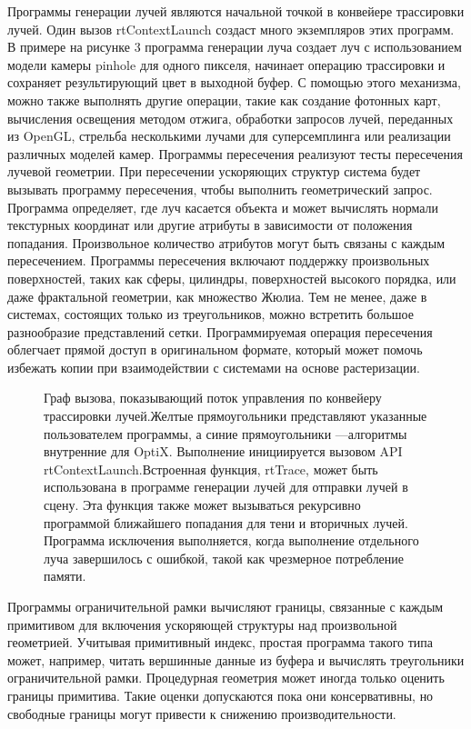 Программы генерации лучей являются начальной точкой в конвейере трассировки лучей.
Один вызов rtContextLaunch создаст много экземпляров этих программ.
В примере на рисунке 3 программа генерации луча создает луч с использованием модели камеры pinhole для одного пикселя, начинает операцию трассировки и сохраняет результирующий цвет в выходной буфер.
 С помощью этого механизма, можно также выполнять другие операции, такие как создание фотонных карт, вычисления освещения методом отжига, обработки запросов лучей, переданных из OpenGL, стрельба несколькими лучами для суперсемплинга или реализации различных моделей камер.
Программы пересечения реализуют тесты пересечения лучевой геометрии.
При пересечении ускоряющих структур система будет вызывать программу пересечения, чтобы выполнить геометрический запрос.
Программа определяет, где луч касается объекта и может вычислять нормали текстурных координат или другие атрибуты в зависимости от положения попадания.
Произвольное количество атрибутов могут быть связаны с каждым пересечением.
Программы пересечения включают поддержку произвольных поверхностей, таких как сферы, цилиндры, поверхностей высокого порядка, или даже фрактальной геометрии, как множество Жюлиа.
Тем не менее, даже в системах, состоящих только из треугольников, можно встретить большое разнообразие представлений сетки.
Программируемая операция пересечения облегчает прямой доступ в оригинальном формате, который может помочь избежать копии при взаимодействии с системами на основе растеризации.
\begin{figure}[h]
\caption{Граф вызова, показывающий поток управления по конвейеру трассировки лучей.Желтые прямоугольники представляют указанные пользователем программы, а синие прямоугольники ---алгоритмы внутренние для OptiX.
Выполнение инициируется вызовом API rtContextLaunch.Встроенная функция, rtTrace, может быть использована в программе генерации лучей для отправки лучей в сцену.
Эта функция также может вызываться рекурсивно программой ближайшего попадания для тени и вторичных лучей.
Программа исключения выполняется, когда выполнение отдельного луча завершилось с ошибкой, такой как чрезмерное потребление памяти.}
\label{fig:graph-of-calling}
\end{figure}

Программы ограничительной рамки вычисляют границы, связанные с каждым примитивом для включения ускоряющей структуры над произвольной геометрией.
Учитывая примитивный индекс, простая программа такого типа может, например, читать вершинные данные из буфера и вычислять треугольники ограничительной рамки.
Процедурная геометрия может иногда только оценить границы примитива.
Такие оценки допускаются пока они консервативны, но свободные границы могут привести к снижению производительности.

